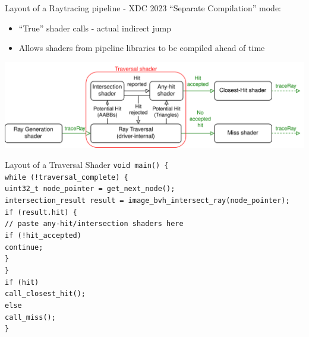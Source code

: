 \documentclass[aspectratio=169,t]{beamer}
\begin{document}
\begin{slide}{Layout of a Raytracing pipeline - XDC 2023}
 ``Separate Compilation'' mode:
 \begin{itemize}
  \item ``True'' shader calls - actual indirect jump
  \item Allows shaders from pipeline libraries to be compiled ahead of time
 \end{itemize}

 \includegraphics[width=1.0651\linewidth]{graphics/RTStages10.png}

\end{slide}

\begin{slide}{Layout of a Traversal Shader}
  \vspace*{-2pt} %
  \texttt{void main() \{ \\
  \hspace*{8pt}while (!traversal\_complete) \{ \\
  \hspace*{16pt}uint32\_t node\_pointer = get\_next\_node(); \\
  \hspace*{16pt}intersection\_result result = image\_bvh\_intersect\_ray(node\_pointer); \\
  \hspace*{16pt}if (result.hit) \{ \\
  \hspace*{24pt}// paste any-hit/intersection shaders here \\
  \hspace*{24pt}if (!hit\_accepted) \\
  \hspace*{32pt}continue; \\
  \hspace*{16pt}\} \\
  \hspace*{8pt}\} \\
  \hspace*{8pt}if (hit) \\
  \hspace*{16pt}call\_closest\_hit(); \\
  \hspace*{8pt}else \\
  \hspace*{16pt}call\_miss(); \\
  \}} \\
\end{slide}
\end{document}
